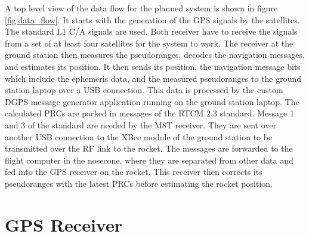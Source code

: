A top level view of the data flow for the planned system is shown in figure \ref{fig:data_flow}.
It starts with the generation of the GPS signals by the satellites.
The standard L1 C/A signals are used.
Both receiver have to receive the signals from a set of at least four satellites for the system to work.
The receiver at the ground station then measures the pseudoranges, decodes the navigation messages, and estimates its position.
It then sends its position, the navigation message bits which include the ephemeris data, and the measured pseudoranges to the ground station laptop over a USB connection.
This data is processed by the custom DGPS message generator application running on the ground station laptop.
The calculated PRCs are packed in messages of the RTCM 2.3 standard.
Message 1 and 3 of the standard are needed by the M8T receiver.
They are sent over another USB connection to the XBee module of the ground station to be transmitted over the RF link to the rocket.
The messages are forwarded to the flight computer in the nosecone, where they are separated from other data and fed into the GPS receiver on the rocket.
This receiver then corrects its pseudoranges with the latest PRCs before estimating the rocket position.


\section{GPS Receiver}\label{sec:receiver}

